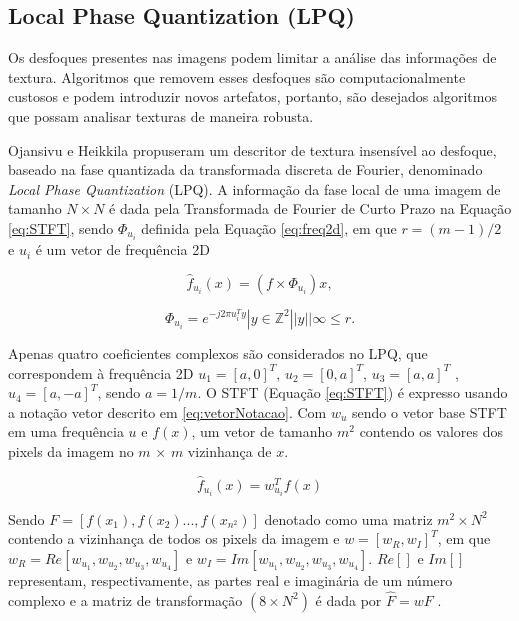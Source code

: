 \subsection{Local Phase Quantization (LPQ)}

Os desfoques presentes nas imagens podem limitar a análise das informações de textura. Algoritmos que removem esses desfoques são computacionalmente custosos e podem introduzir novos artefatos, portanto, são desejados algoritmos que possam analisar texturas de maneira robusta.

Ojansivu e Heikkila \cite{ojansivu2008blur} propuseram um descritor de textura insensível ao desfoque, baseado na fase quantizada da transformada discreta de Fourier, denominado \textit{Local Phase Quantization} (LPQ). A informação da fase local de uma imagem de tamanho $N \times N$ é dada pela Transformada de Fourier de Curto Prazo na Equação \ref{eq:STFT}, sendo $\Phi_{u_{i}}$ definida pela Equação \ref{eq:freq2d}, em que $r = (m - 1)/2$ e $u_i$ é um vetor de frequência 2D

\begin{equation}
	\hat{f}_{u_{i}}(x) = (f \times \Phi_{u_{i}})x,
	\label{eq:STFT}
\end{equation} 

\begin{equation}
	\Phi_{u_{i}} = e^{-j2\pi u^{T}_{i} y} |y \in \mathbb{Z}^2||y||\infty \leq r.
	\label{eq:freq2d}
\end{equation} 

Apenas quatro coeficientes complexos são considerados no LPQ, que correspondem à frequência 2D $u_1 = [a,0]^T$, $u_2 = [0,a]^T$, $u_3 = [a,a]^T$ , $u_4 = [a,-a]^T$, sendo $a = 1/m$. O STFT (Equação \ref{eq:STFT}) é expresso usando a notação vetor descrito em \ref{eq:vetorNotacao}. Com $w_u$ sendo o vetor base STFT em uma frequência $u$ e $f(x)$, um vetor de tamanho $m^2$ contendo os valores dos pixels da imagem no $m$ $\times$ $m $ vizinhança de $x$.

\begin{equation}
	\hat{f}_{u_{i}}(x) = w^{T}_{u_{i}}f(x)
	\label{eq:vetorNotacao}
\end{equation}

Sendo $F = [f(x_1),f(x_2)...,f(x_{n^2})]$ denotado como uma matriz $m^2 \times N^2$ contendo a vizinhança de todos os pixels da imagem e $w = [w_R,w_I]^T$, em que $w_R = Re[w_{u_1},w_{u_2},w_{u_3},w_{u_4}]$ e $w_I = Im[w_{u_1} ,w_{u_2},w_{u_3},w_{u_4}]$. $Re[]$ e $Im[]$ representam, respectivamente, as partes real e imaginária de um número complexo e a matriz de transformação $(8 \times N^2)$ é dada por $\hat{F} = wF$ .

